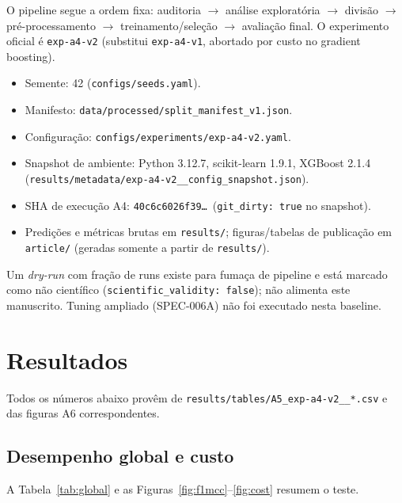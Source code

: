 \documentclass[11pt,a4paper]{article}
\begin{document}
O pipeline segue a ordem fixa: auditoria $\to$ análise exploratória $\to$
divisão $\to$ pré-processamento $\to$ treinamento/seleção $\to$ avaliação final.
O experimento oficial é \texttt{exp-a4-v2} (substitui \texttt{exp-a4-v1},
abortado por custo no gradient boosting).

\begin{itemize}
  \item Semente: 42 (\texttt{configs/seeds.yaml}).
  \item Manifesto: \texttt{data/processed/split\_manifest\_v1.json}.
  \item Configuração: \texttt{configs/experiments/exp-a4-v2.yaml}.
  \item Snapshot de ambiente: Python 3.12.7, scikit-learn 1.9.1, XGBoost 2.1.4
  (\texttt{results/metadata/exp-a4-v2\_\_config\_snapshot.json}).
  \item SHA de execução A4: \texttt{40c6c6026f39\ldots}\ (\texttt{git\_dirty:
  true} no snapshot).
  \item Predições e métricas brutas em \texttt{results/}; figuras/tabelas de
  publicação em \texttt{article/} (geradas somente a partir de \texttt{results/}).
\end{itemize}

Um \emph{dry-run} com fração de runs existe para fumaça de pipeline e está
marcado como não científico (\texttt{scientific\_validity: false}); não alimenta
este manuscrito. Tuning ampliado (SPEC-006A) não foi executado nesta baseline.

\section{Resultados}
\label{sec:resultados}

Todos os números abaixo provêm de
\texttt{results/tables/A5\_exp-a4-v2\_\_*.csv} e das figuras A6
correspondentes.

\subsection{Desempenho global e custo}

A Tabela~\ref{tab:global} e as Figuras~\ref{fig:f1mcc}--\ref{fig:cost}
resumem o teste.
\end{document}
